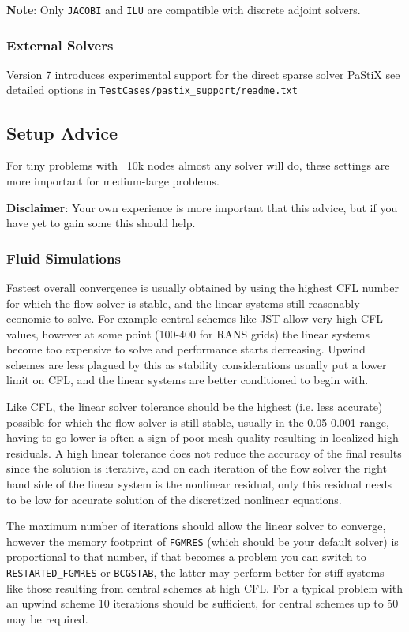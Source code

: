 \documentclass[12pt, a4paper, twoside]{article}
\begin{document}
\fi

\textbf{Note}: Only \verb|JACOBI| and \verb|ILU| are compatible with discrete adjoint solvers.

\subsubsection{External Solvers}
Version 7 introduces experimental support for the direct sparse solver PaStiX see detailed options in \verb|TestCases/pastix_support/readme.txt|

\subsection{Setup Advice}
For tiny problems with ~10k nodes almost any solver will do, these settings are more important for medium-large problems.

\textbf{Disclaimer}: Your own experience is more important that this advice, but if you have yet to gain some this should help.

\subsubsection{Fluid Simulations}
Fastest overall convergence is usually obtained by using the highest CFL number for which the flow solver is stable, and the linear systems still reasonably economic to solve. For example central schemes like JST allow very high CFL values, however at some point (100-400 for RANS grids) the linear systems become too expensive to solve and performance starts decreasing. Upwind schemes are less plagued by this as stability considerations usually put a lower limit on CFL, and the linear systems are better conditioned to begin with.

Like CFL, the linear solver tolerance should be the highest (i.e. less accurate) possible for which the flow solver is still stable, usually in the 0.05-0.001 range, having to go lower is often a sign of poor mesh quality resulting in localized high residuals. A high linear tolerance does not reduce the accuracy of the final results since the solution is iterative, and on each iteration of the flow solver the right hand side of the linear system is the nonlinear residual, only this residual needs to be low for accurate solution of the discretized nonlinear equations.

The maximum number of iterations should allow the linear solver to converge, however the memory footprint of \verb|FGMRES| (which should be your default solver) is proportional to that number, if that becomes a problem you can switch to \verb|RESTARTED_FGMRES| or \verb|BCGSTAB|, the latter may perform better for stiff systems like those resulting from central schemes at high CFL. For a typical problem with an upwind scheme 10 iterations should be sufficient, for central schemes up to 50 may be required.
\end{document}
